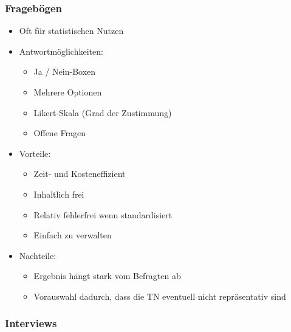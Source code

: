 \subsubsection{Fragebögen}

\begin{itemize}
\item
  Oft für statistischen Nutzen
\item
  Antwortmöglichkeiten:

  \begin{itemize}
  \item
    Ja / Nein-Boxen
  \item
    Mehrere Optionen
  \item
    Likert-Skala (Grad der Zustimmung)
  \item
    Offene Fragen
  \end{itemize}
\item
  Vorteile:

  \begin{itemize}
  \item
    Zeit- und Kosteneffizient
  \item
    Inhaltlich frei
  \item
    Relativ fehlerfrei wenn standardisiert
  \item
    Einfach zu verwalten
  \end{itemize}
\item
  Nachteile:

  \begin{itemize}
  \item
    Ergebnis hängt stark vom Befragten ab
  \item
    Vorauswahl dadurch, dass die TN eventuell nicht repräsentativ sind
  \end{itemize}
\end{itemize}

\subsubsection{Interviews}

